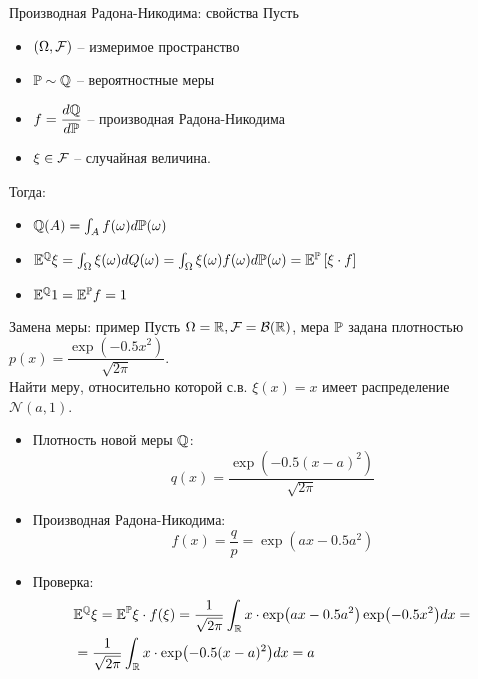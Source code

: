 \documentclass[aspectratio=169]{beamer}
\begin{document}
\begin{frame}{Производная Радона-Никодима: свойства}
    Пусть 
    \begin{itemize} 
        \item $(\Omega, \mathcal{F})$ -- измеримое пространство
        \item $\mathbb{P} \sim \mathbb{Q}$ -- вероятностные меры
        \item $f=\dfrac{d\mathbb{Q}}{d\mathbb{P}}$ -- производная Радона-Никодима 
        \item $\xi \in \mathcal{F}$ -- случайная величина.
    \end{itemize}
    \pause Тогда:
    \begin{itemize}
        \item $\mathbb{Q}(A) = \int_{A} f(\omega) d\mathbb{P}(\omega)$
        \item $\mathbb{E}^{\mathbb{Q}} \xi = \int_{\Omega} \xi(\omega) dQ(\omega) = \int_{\Omega} \xi(\omega) f(\omega) d\mathbb{P}(\omega)
        = \mathbb{E}^{\mathbb{P}} \left[\xi \cdot f\right]$ 
        \item $\mathbb{E}^{\mathbb{Q}} 1 = \mathbb{E}^{\mathbb{P}} f = 1$
    \end{itemize}
\end{frame}

\begin{frame}{Замена меры: пример}
    Пусть $\Omega=\mathbb{R}, \mathcal{F} = \mathcal{B}(\mathbb{R})$, мера $\mathbb{P}$ задана плотностью $p(x) = \dfrac{\exp(-0.5x^2)}{\sqrt{2\pi}}$.
    \\ Найти меру, относительно которой с.в. $\xi(x) = x$ имеет распределение $\mathcal{N}(a, 1)$.
    \pause
    \begin{itemize}
        \item Плотность новой меры $\mathbb{Q}$:
        $$q(x) = \dfrac{\exp(-0.5(x-a)^2)}{\sqrt{2\pi}}$$
        \item Производная Радона-Никодима:
        $$
            f(x) = \dfrac{q}{p} = \exp(ax - 0.5 a^2)
        $$
        \item Проверка:
        \begin{align*}
            &\mathbb{E}^{\mathbb{Q}} \xi = \mathbb{E}^{\mathbb{P}} \xi \cdot f(\xi)
            = \dfrac{1}{\sqrt{2\pi}} \int_{\mathbb{R}} x \cdot\exp(ax - 0.5 a^2) \exp(-0.5x^2) dx = \\
            &= \dfrac{1}{\sqrt{2\pi}} \int_{\mathbb{R}} x \cdot\exp(-0.5(x-a)^2) dx = a
        \end{align*}
    \end{itemize}
\end{frame}
\end{document}
